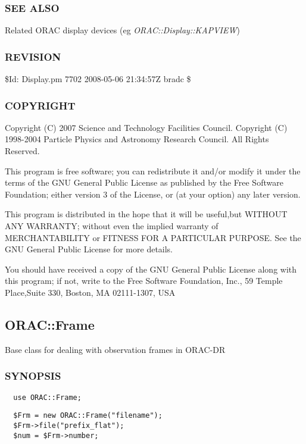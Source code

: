 \subsubsection*{SEE ALSO\label{ORAC::Display_SEE_ALSO}}


Related ORAC display devices (eg \emph{ORAC::Display::KAPVIEW})

\subsubsection*{REVISION\label{ORAC::Display_REVISION}}


\$Id: Display.pm 7702 2008-05-06 21:34:57Z bradc \$

\subsubsection*{COPYRIGHT\label{ORAC::Display_COPYRIGHT}}


Copyright (C) 2007 Science and Technology Facilities Council.
Copyright (C) 1998-2004 Particle Physics and Astronomy Research
Council. All Rights Reserved.



This program is free software; you can redistribute it and/or modify it under
the terms of the GNU General Public License as published by the Free Software
Foundation; either version 3 of the License, or (at your option) any later
version.



This program is distributed in the hope that it will be useful,but WITHOUT ANY
WARRANTY; without even the implied warranty of MERCHANTABILITY or FITNESS FOR A
PARTICULAR PURPOSE. See the GNU General Public License for more details.



You should have received a copy of the GNU General Public License along with
this program; if not, write to the Free Software Foundation, Inc., 59 Temple
Place,Suite 330, Boston, MA  02111-1307, USA

\subsection{ORAC::Frame\label{ORAC::Frame}}


Base class for dealing with observation frames in ORAC-DR

\subsubsection*{SYNOPSIS\label{ORAC::Frame_SYNOPSIS}}
\begin{verbatim}
  use ORAC::Frame;
\end{verbatim}
\begin{verbatim}
  $Frm = new ORAC::Frame("filename");
  $Frm->file("prefix_flat");
  $num = $Frm->number;
\end{verbatim}
